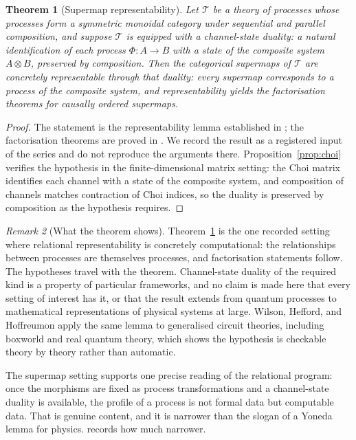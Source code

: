 \documentclass[11pt,letterpaper]{article}
\newtheorem{theorem}{Theorem}[section]
\theoremstyle{definition}
\theoremstyle{remark}
\newtheorem{remark}[theorem]{Remark}
\begin{document}
\begin{theorem}[Supermap representability]
\label{thm:supermap}
Let $\mathcal{T}$ be a theory of processes whose processes form a symmetric monoidal category under sequential and parallel composition, and suppose $\mathcal{T}$ is equipped with a channel-state duality: a natural identification of each process $\Phi \colon A \to B$ with a state of the composite system $A \otimes B$, preserved by composition. Then the categorical supermaps of $\mathcal{T}$ are concretely representable through that duality: every supermap corresponds to a process of the composite system, and representability yields the factorisation theorems for causally ordered supermaps.
\end{theorem}

\begin{proof}
The statement is the representability lemma established in \cite{whh}; the factorisation theorems are proved in \cite{hw}. We record the result as a registered input of the series and do not reproduce the arguments there. Proposition~\ref{prop:choi} verifies the hypothesis in the finite-dimensional matrix setting: the Choi matrix identifies each channel with a state of the composite system, and composition of channels matches contraction of Choi indices, so the duality is preserved by composition as the hypothesis requires.
\end{proof}

\begin{remark}[What the theorem shows]
\label{rem:supermap}
Theorem~\ref{thm:supermap} is the one recorded setting where relational representability is concretely computational: the relationships between processes are themselves processes, and factorisation statements follow. The hypotheses travel with the theorem. Channel-state duality of the required kind is a property of particular frameworks, and no claim is made here that every setting of interest has it, or that the result extends from quantum processes to mathematical representations of physical systems at large. Wilson, Hefford, and Hoffreumon \cite{whh} apply the same lemma to generalised circuit theories, including boxworld and real quantum theory, which shows the hypothesis is checkable theory by theory rather than automatic.
\end{remark}

The supermap setting supports one precise reading of the relational program: once the morphisms are fixed as process transformations and a channel-state duality is available, the profile of a process is not formal data but computable data. That is genuine content, and it is narrower than the slogan of a Yoneda lemma for physics.  records how much narrower.
\end{document}
